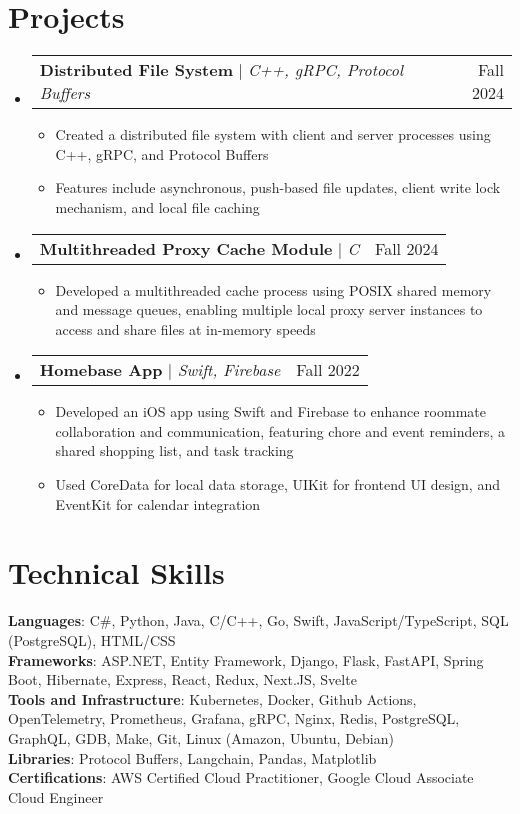 \documentclass[letterpaper,11pt]{article}
\makeatletter
\newcommand{\resumeItem}[1]{
  \item\small{
    {#1 \vspace{-2pt}}
  }
}
\newcommand{\resumeProjectHeading}[2]{
    \item
    \begin{tabular*}{0.97\textwidth}{l@{\extracolsep{\fill}}r}
      \small#1 & #2 \\
    \end{tabular*}\vspace{-7pt}
}
\newcommand{\resumeSubHeadingListStart}{\begin{itemize}[leftmargin=0.15in, label={}]}
\newcommand{\resumeSubHeadingListEnd}{\end{itemize}}
\newcommand{\resumeItemListStart}{\begin{itemize}}
\newcommand{\resumeItemListEnd}{\end{itemize}\vspace{-5pt}}
\makeatother
\begin{document}
\section{Projects}
    \resumeSubHeadingListStart
      \resumeProjectHeading
          {\textbf{Distributed File System} $|$ \emph{C++, gRPC, Protocol Buffers}}{Fall 2024}
          \resumeItemListStart
            \resumeItem{Created a distributed file system with client and server processes using C++, gRPC, and Protocol Buffers}
            \resumeItem{Features include asynchronous, push-based file updates, client write lock mechanism, and local file caching}
          \resumeItemListEnd
      \resumeProjectHeading
          {\textbf{Multithreaded Proxy Cache Module} $|$ \emph{C}}{Fall 2024}
          \resumeItemListStart
            \resumeItem{Developed a multithreaded cache process using POSIX shared memory and message queues, enabling multiple local proxy server instances to access and share files at in-memory speeds}
          \resumeItemListEnd
      \resumeProjectHeading
          {\textbf{Homebase App} $|$ \emph{Swift, Firebase}}{Fall 2022}
          \resumeItemListStart
            \resumeItem{Developed an iOS app using Swift and Firebase to enhance roommate collaboration and communication, featuring chore and event reminders, a shared shopping list, and task tracking}
            \resumeItem{Used CoreData for local data storage, UIKit for frontend UI design, and EventKit for calendar integration}
          \resumeItemListEnd
    \resumeSubHeadingListEnd

%
\section{Technical Skills}
 \begin{itemize}[leftmargin=0.15in, label={}]
    \small{\item{
     \textbf{Languages}{: C\#, Python, Java, C/C++, Go, Swift, JavaScript/TypeScript, SQL (PostgreSQL), HTML/CSS} \\
     \textbf{Frameworks}{: ASP.NET, Entity Framework, Django, Flask, FastAPI, Spring Boot, Hibernate, Express, React, Redux, Next.JS, Svelte} \\
     \textbf{Tools and Infrastructure}{: Kubernetes, Docker, Github Actions, OpenTelemetry, Prometheus, Grafana, gRPC, Nginx, Redis, PostgreSQL, GraphQL, GDB, Make, Git, Linux (Amazon, Ubuntu, Debian) } \\
     \textbf{Libraries}{: Protocol Buffers, Langchain, Pandas, Matplotlib } \\
     \textbf{Certifications}{: AWS Certified Cloud Practitioner, Google Cloud Associate Cloud Engineer}
    }}
 \end{itemize}

\end{document}
